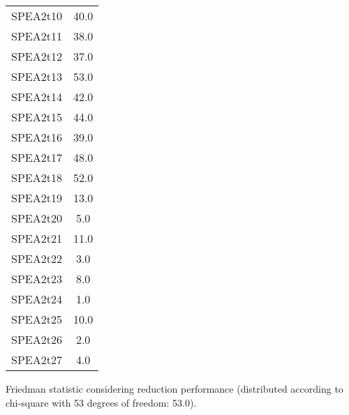 \documentclass{article}
\begin{document}
\begin{table}[!htp]
\begin{tabular}{c|c}
SPEA2t10&40.0\\
SPEA2t11&38.0\\
SPEA2t12&37.0\\
SPEA2t13&53.0\\
SPEA2t14&42.0\\
SPEA2t15&44.0\\
SPEA2t16&39.0\\
SPEA2t17&48.0\\
SPEA2t18&52.0\\
SPEA2t19&13.0\\
SPEA2t20&5.0\\
SPEA2t21&11.0\\
SPEA2t22&3.0\\
SPEA2t23&8.0\\
SPEA2t24&1.0\\
SPEA2t25&10.0\\
SPEA2t26&2.0\\
SPEA2t27&4.0\\
\end{tabular}
\end{table}


Friedman statistic considering reduction performance (distributed according to chi-square with 53 degrees of freedom: 53.0).
\end{document}
